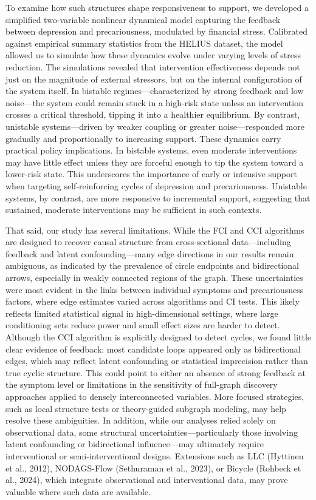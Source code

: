 \documentclass[
]{article}
\begin{document}
To examine how such structures shape responsiveness to support, we
developed a simplified two-variable nonlinear dynamical model capturing
the feedback between depression and precariousness, modulated by
financial stress. Calibrated against empirical summary statistics from
the HELIUS dataset, the model allowed us to simulate how these dynamics
evolve under varying levels of stress reduction. The simulations
revealed that intervention effectiveness depends not just on the
magnitude of external stressors, but on the internal configuration of
the system itself. In bistable regimes---characterized by strong
feedback and low noise---the system could remain stuck in a high-risk
state unless an intervention crosses a critical threshold, tipping it
into a healthier equilibrium. By contrast, unistable systems---driven by
weaker coupling or greater noise---responded more gradually and
proportionally to increasing support. These dynamics carry practical
policy implications. In bistable systems, even moderate interventions
may have little effect unless they are forceful enough to tip the system
toward a lower-risk state. This underscores the importance of early or
intensive support when targeting self-reinforcing cycles of depression
and precariousness. Unistable systems, by contrast, are more responsive
to incremental support, suggesting that sustained, moderate
interventions may be sufficient in such contexts.

That said, our study has several limitations. While the FCI and CCI
algorithms are designed to recover causal structure from cross-sectional
data---including feedback and latent confounding---many edge directions
in our results remain ambiguous, as indicated by the prevalence of
circle endpoints and bidirectional arrows, especially in weakly
connected regions of the graph. These uncertainties were most evident in
the links between individual symptoms and precariousness factors, where
edge estimates varied across algorithms and CI tests. This likely
reflects limited statistical signal in high-dimensional settings, where
large conditioning sets reduce power and small effect sizes are harder
to detect. Although the CCI algorithm is explicitly designed to detect
cycles, we found little clear evidence of feedback: most candidate loops
appeared only as bidirectional edges, which may reflect latent
confounding or statistical imprecision rather than true cyclic
structure. This could point to either an absence of strong feedback at
the symptom level or limitations in the sensitivity of full-graph
discovery approaches applied to densely interconnected variables. More
focused strategies, such as local structure tests or theory-guided
subgraph modeling, may help resolve these ambiguities. In addition,
while our analyses relied solely on observational data, some structural
uncertainties---particularly those involving latent confounding or
bidirectional influence---may ultimately require interventional or
semi-interventional designs. Extensions such as LLC (Hyttinen et al.,
2012), NODAGS-Flow (Sethuraman et al., 2023), or Bicycle (Rohbeck et
al., 2024), which integrate observational and interventional data, may
prove valuable where such data are available.
\end{document}

